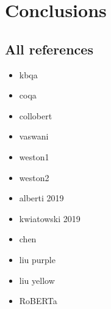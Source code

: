 \documentclass[12pt,a4paper,hidelinks]{article}
\begin{document}
\section{Conclusions}\label{sec:conclusions}

\subsection{All references}

\begin{itemize}
  \item kbqa~\cite{kbqa}    
  \item coqa~\cite{coqa}
  \item collobert~\cite{Collobert}
  \item vaswani~\cite{vaswani}
  \item weston1~\cite{weston-tracking}
  \item weston2~\cite{weston-reading}
  \item alberti 2019~\cite{alberti}
  \item kwiatowski 2019~\cite{kwiatowski}
  \item chen~\cite{chen}
  \item liu purple~\cite{liu-purple}
  \item liu yellow~\cite{liu-yellow}
  \item RoBERTa~\cite{roberta}
\end{itemize}




\end{document}
